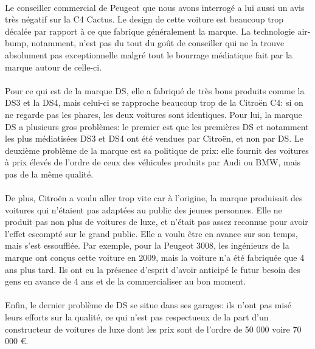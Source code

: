 \documentclass[12pt]{article}\usepackage[]{graphicx}\usepackage[]{color}
\begin{document}
\paragraph{} Le conseiller commercial de Peugeot que nous avons interrogé a lui
aussi un avis très négatif sur la C4 Cactus. Le design de cette voiture est
beaucoup trop décalée par rapport à ce que fabrique généralement la marque. La
technologie air-bump, notamment, n'est pas du tout du goût de conseiller qui ne
la trouve absolument pas exceptionnelle malgré tout le bourrage médiatique fait
par la marque autour de celle-ci.

\paragraph{} Pour ce qui est de la marque DS, elle a fabriqué de très bons
produits comme la DS3 et la DS4, mais celui-ci se rapproche beaucoup trop de la
Citroën C4: si on ne regarde pas les phares, les deux voitures sont identiques.
Pour lui, la marque DS a plusieurs gros problèmes: le premier est que les
premières DS et notamment les plus médiatisées DS3 et DS4 ont été vendues par
Citroën, et non par DS. Le deuxième problème de la marque est sa politique de
prix: elle fournit des voitures à prix élevés de l'ordre de ceux des véhicules
produits par Audi ou BMW, mais pas de la même qualité.

\paragraph{} De plus, Citroën a voulu aller trop vite car à l'origine, la
marque produisait des voitures qui n'étaient pas adaptées au public des jeunes
personnes.  Elle ne produit pas non plus de voitures de luxe, et n'était pas
assez reconnue pour avoir l'effet escompté sur le grand public. Elle a voulu
être en avance sur son temps, mais s'est essoufflée. Par exemple, pour la
Peugeot 3008, les ingénieurs de la marque ont conçus cette voiture en 2009,
mais la voiture n'a été fabriquée que 4 ans plus tard. Ils ont eu la présence
d'esprit d'avoir anticipé le futur besoin des gens en avance de 4 ans et de la
commercialiser au bon moment.

\paragraph{} Enfin, le dernier problème de DS se situe dans ses garages: ils
n'ont pas misé leurs efforts sur la qualité, ce qui n'est pas respectueux de
la part d'un constructeur de voitures de luxe dont les prix sont de l'ordre de
50 000 voire 70 000 €.
\end{document}
